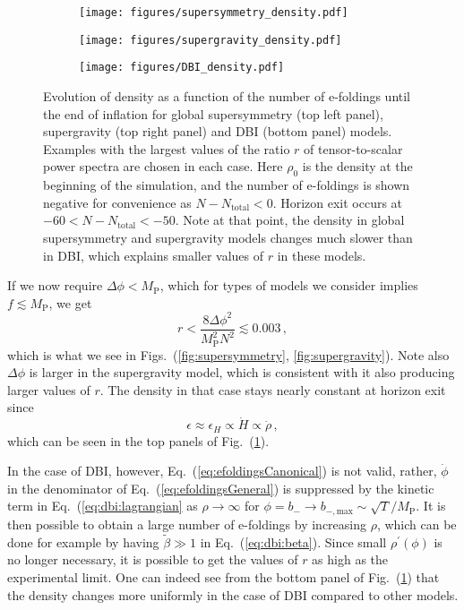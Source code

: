 \documentclass[12pt]{article}
\begin{document}
\begin{figure}
  \centering
  \begin{subfigure}{0.45 \textwidth}
    \texttt{[image: figures/supersymmetry\_density.pdf]}
  \end{subfigure}
  \begin{subfigure}{0.45 \textwidth}
    \texttt{[image: figures/supergravity\_density.pdf]}
  \end{subfigure}
  \begin{subfigure}{0.45 \textwidth}
    \texttt{[image: figures/DBI\_density.pdf]}
  \end{subfigure}
  \caption{
    Evolution of density as a function of the number of e-foldings until the end of inflation for global supersymmetry (top left panel), supergravity (top right panel) and DBI (bottom panel) models.
    Examples with the largest values of the ratio $r$ of tensor-to-scalar power spectra are chosen in each case.
    Here $\rho_0$ is the density at the beginning of the simulation, and the number of e-foldings is shown negative for convenience as $N - N_\text{total} < 0$.
    Horizon exit occurs at $-60 < N - N_\text{total} < -50$.
    Note at that point, the density in global supersymmetry and supergravity models changes much slower than in DBI, which explains smaller values of $r$ in these models.
  } \label{fig:density}
\end{figure}

If we now require $\Delta \phi < M_\text{P}$, which for types of models we consider implies $f \lesssim M_\text{P}$, we get
\begin{equation}
  r < \frac{8 \Delta \phi^2}{M_\text{P}^2 N^2} \lesssim 0.003\,,
\end{equation}
which is what we see in Figs.~(\ref{fig:supersymmetry}, \ref{fig:supergravity}).
Note also $\Delta\phi$ is larger in the supergravity model, which is consistent with it also producing larger values of $r$.
The density in that case stays nearly constant at horizon exit since
\begin{equation}
  \epsilon \approx \epsilon_H \propto \dot H \propto \dot\rho\,,
\end{equation}
which can be seen in the top panels of Fig.~(\ref{fig:density}).

In the case of DBI, however, Eq.~(\ref{eq:efoldingsCanonical}) is not valid, rather, $\dot\phi$ in the denominator of Eq.~(\ref{eq:efoldingsGeneral}) is suppressed by the kinetic term in Eq.~(\ref{eq:dbi:lagrangian} as $\rho \rightarrow \infty$ for $\phi = b_- \rightarrow b_{-, \text{max}} \sim \sqrt{T} / M_\text{P}$.
It is then possible to obtain a large number of e-foldings by increasing $\rho$, which can be done for example by having $\tilde\beta \gg 1$ in Eq.~(\ref{eq:dbi:beta}).
Since small $\rho^\prime\left(\phi\right)$ is no longer necessary, it is possible to get the values of $r$ as high as the experimental limit.
One can indeed see from the bottom panel of Fig.~(\ref{fig:density}) that the density changes more uniformly in the case of DBI compared to other models.
\end{document}
